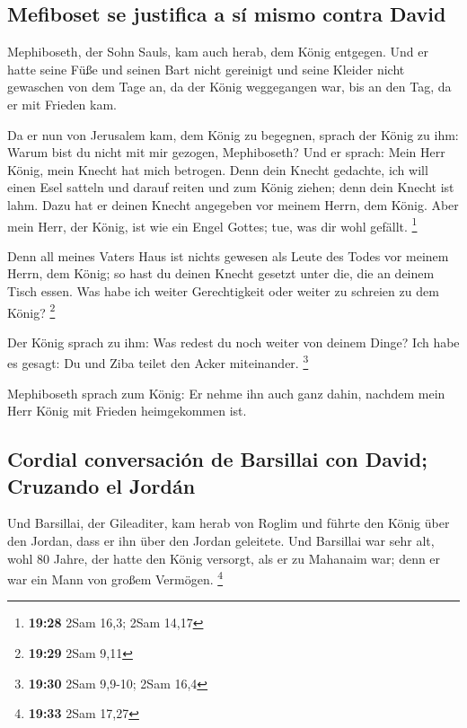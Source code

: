 \hypertarget{mefiboset-se-justifica-a-suxed-mismo-contra-david}{%
\subsection{Mefiboset se justifica a sí mismo contra
David}\label{mefiboset-se-justifica-a-suxed-mismo-contra-david}}

 Mephiboseth, der Sohn Sauls, kam auch herab, dem König
entgegen. Und er hatte seine Füße und seinen Bart nicht gereinigt und
seine Kleider nicht gewaschen von dem Tage an, da der König weggegangen
war, bis an den Tag, da er mit Frieden kam.

 Da er nun von Jerusalem kam, dem König zu begegnen,
sprach der König zu ihm: Warum bist du nicht mit mir gezogen,
Mephiboseth?  Und er sprach: Mein Herr König, mein Knecht
hat mich betrogen. Denn dein Knecht gedachte, ich will einen Esel
satteln und darauf reiten und zum König ziehen; denn dein Knecht ist
lahm.  Dazu hat er deinen Knecht angegeben vor meinem
Herrn, dem König. Aber mein Herr, der König, ist wie ein Engel Gottes;
tue, was dir wohl gefällt. \footnote{\textbf{19:28} 2Sam 16,3; 2Sam
  14,17}

 Denn all meines Vaters Haus ist nichts gewesen als Leute
des Todes vor meinem Herrn, dem König; so hast du deinen Knecht gesetzt
unter die, die an deinem Tisch essen. Was habe ich weiter Gerechtigkeit
oder weiter zu schreien zu dem König? \footnote{\textbf{19:29} 2Sam 9,11}

 Der König sprach zu ihm: Was redest du noch weiter von
deinem Dinge? Ich habe es gesagt: Du und Ziba teilet den Acker
miteinander. \footnote{\textbf{19:30} 2Sam 9,9-10; 2Sam 16,4}

 Mephiboseth sprach zum König: Er nehme ihn auch ganz
dahin, nachdem mein Herr König mit Frieden heimgekommen ist.

\hypertarget{cordial-conversaciuxf3n-de-barsillai-con-david-cruzando-el-jorduxe1n}{%
\subsection{Cordial conversación de Barsillai con David; Cruzando el
Jordán}\label{cordial-conversaciuxf3n-de-barsillai-con-david-cruzando-el-jorduxe1n}}

 Und Barsillai, der Gileaditer, kam herab von Roglim und
führte den König über den Jordan, dass er ihn über den Jordan geleitete.
 Und Barsillai war sehr alt, wohl 80 Jahre, der hatte den
König versorgt, als er zu Mahanaim war; denn er war ein Mann von großem
Vermögen. \footnote{\textbf{19:33} 2Sam 17,27}

